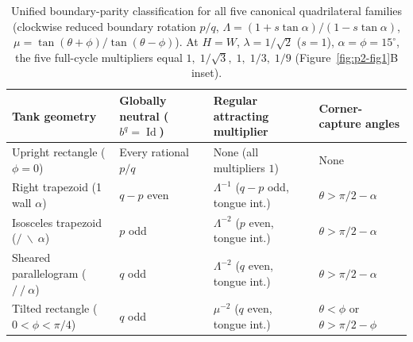 \documentclass[11pt,reqno]{amsart}
\theoremstyle{definition}
\theoremstyle{remark}
\DeclareMathOperator{\Id}{Id}
\begin{document}
\begin{table}[ht]
\centering
\caption{Unified boundary-parity classification for all five canonical quadrilateral families (clockwise reduced boundary rotation $p/q$, $\Lambda = (1+s\tan\alpha)/(1-s\tan\alpha)$, $\mu = \tan(\theta+\phi)/\tan(\theta-\phi)$). At $H = W$, $\lambda = 1/\sqrt{2}$ ($s=1$), $\alpha = \phi = 15^\circ$, the five full-cycle multipliers equal $1,\; 1/\sqrt{3},\; 1,\; 1/3,\; 1/9$ (Figure~\ref{fig:p2-fig1}B inset).}
\label{tab:five-tanks}
\footnotesize
\setlength{\tabcolsep}{4pt}
\begin{tabular}{@{}llll@{}}
\toprule
Tank geometry & Globally neutral ($b^q=\Id$) & Regular attracting multiplier & Corner-capture angles \\
\midrule
Upright rectangle ($\phi=0$) & Every rational $p/q$ & None (all multipliers $1$) & None \\
Right trapezoid (1 wall $\alpha$) & $q - p$ even & $\Lambda^{-1}$ ($q-p$ odd, tongue int.) & $\theta > \pi/2 - \alpha$ \\
Isosceles trapezoid ($/\ \backslash\ \alpha$) & $p$ odd & $\Lambda^{-2}$ ($p$ even, tongue int.) & $\theta > \pi/2 - \alpha$ \\
Sheared parallelogram ($/\ /\ \alpha$) & $q$ odd & $\Lambda^{-2}$ ($q$ even, tongue int.) & $\theta > \pi/2 - \alpha$ \\
Tilted rectangle ($0<\phi<\pi/4$) & $q$ odd & $\mu^{-2}$ ($q$ even, tongue int.) & $\theta < \phi$ or $\theta > \pi/2 - \phi$ \\
\bottomrule
\end{tabular}
\end{table}
\end{document}
